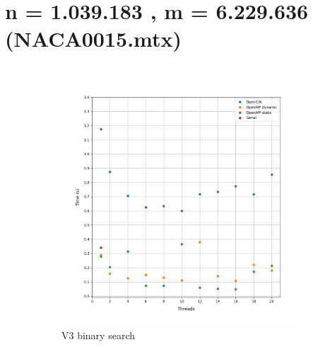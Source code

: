 \documentclass[12pt, a4paper]{article}
\begin{document}
\pagebreak

\section{n = 1.039.183 , m = 6.229.636 (NACA0015.mtx)}

\begin{figure}[h!]
     \begin{subfigure}[b]{0.33\textwidth}
         \centering
         \includegraphics[height=.4\textheight, width=\textwidth, keepaspectratio]{assets/NACA0015/v3.png}
    \caption{V3 binary search}
     \end{subfigure}
     \hfill
     \begin{subfigure}[b]{0.33\textwidth}
         \centering

\end{subfigure}
\end{figure}
\end{document}
